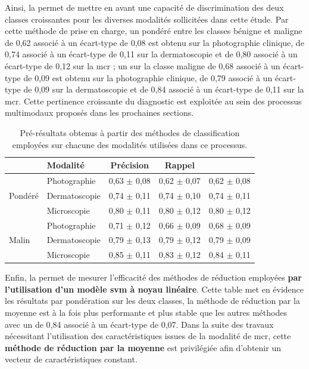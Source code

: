 Ainsi, la  permet de mettre en avant une capacité de discrimination des deux classes croissantes pour les diverses modalités sollicitées dans cette étude. Par cette méthode de prise en charge, un \fscore{} pondéré entre les classes bénigne et maligne de 0,62 associé à un écart-type de 0,08 est obtenu sur la photographie clinique, de 0,74 associé à un écart-type de 0,11 sur la dermatoscopie et de 0,80 associé à un écart-type de 0,12 sur la \gls{mcr} ; un \fscore{} sur la classe maligne de 0,68 associé à un écart-type de 0,09 est obtenu sur la photographie clinique, de 0,79 associé à un écart-type de 0,09 sur la dermatoscopie et de 0,84 associé à un écart-type de 0,11 sur la \gls{mcr}. Cette pertinence croissante du diagnostic est exploitée au sein des processus multimodaux proposés dans les prochaines sections.\par

\begin{table}[H]
    \centering
    \begin{tabular}{llccc} \toprule
        \multicolumn{1}{l}{}     & Modalité      & Précision    & Rappel        & \Fscore{}     \\ \midrule
        \multirow{3}{*}{Pondéré} & Photographie  & 0,63 $\pm$ 0,08& 0,62 $\pm$ 0,07 & 0,62 $\pm$ 0,08 \\
                                 & Dermatoscopie & 0,74 $\pm$ 0,11& 0,74 $\pm$ 0,10 & 0,74 $\pm$ 0,11 \\
                                 & Microscopie   & 0,80 $\pm$ 0,11& 0,80 $\pm$ 0,12 & 0,80 $\pm$ 0,12 \\ \midrule
        \multirow{3}{*}{Malin}   & Photographie  & 0,71 $\pm$ 0,12& 0,66 $\pm$ 0,09 & 0,68 $\pm$ 0,09 \\
                                 & Dermatoscopie & 0,79 $\pm$ 0,13& 0,79 $\pm$ 0,12 & 0,79 $\pm$ 0,09 \\
                                 & Microscopie   & 0,85 $\pm$ 0,11& 0,83 $\pm$ 0,12 & 0,84 $\pm$ 0,11 \\ \bottomrule
    \end{tabular}
    \caption{Pré-résultats obtenus à partir des méthodes de classification employées sur chacune des modalités utilisées dans ce processus.}
    \label{tab:results_multimodality_modalities}
\end{table}

Enfin, la  permet de mesurer l'efficacité des méthodes de réduction employées \textbf{par l'utilisation d'un modèle \gls{svm} à noyau linéaire}. Cette table met en évidence les résultats par pondération sur les deux classes, la méthode de réduction par la moyenne est à la fois plus performante et plus stable que les autres méthodes avec un \fscore{} de 0,84 associé à un écart-type de 0,07. Dans la suite des travaux nécessitant l'utilisation des caractéristiques issues de la modalité de \gls{mcr}, cette \textbf{méthode de réduction par la moyenne} est privilégiée afin d'obtenir un vecteur de caractéristiques constant.\par

